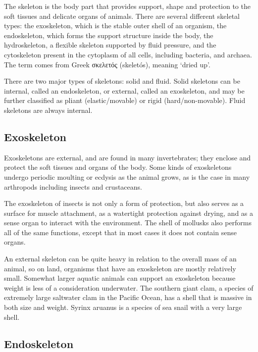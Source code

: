 The skeleton is the body part that provides support, shape and protection to the soft tissues and delicate organs of animals. There are several different skeletal types: the exoskeleton, which is the stable outer shell of an organism, the endoskeleton, which forms the support structure inside the body, the hydroskeleton, a flexible skeleton supported by fluid pressure, and the cytoskeleton present in the cytoplasm of all cells, including bacteria, and archaea. The term comes from Greek σκελετός (skeletós), meaning `dried up'.

There are two major types of skeletons: solid and fluid. Solid skeletons can be internal, called an endoskeleton, or external, called an exoskeleton, and may be further classified as pliant (elastic/movable) or rigid (hard/non-movable). Fluid skeletons are always internal.

\hypertarget{exoskeleton}{%
\subsection{Exoskeleton}\label{exoskeleton}}

Exoskeletons are external, and are found in many invertebrates; they enclose and protect the soft tissues and organs of the body. Some kinds of exoskeletons undergo periodic moulting or ecdysis as the animal grows, as is the case in many arthropods including insects and crustaceans.

The exoskeleton of insects is not only a form of protection, but also serves as a surface for muscle attachment, as a watertight protection against drying, and as a sense organ to interact with the environment. The shell of mollusks also performs all of the same functions, except that in most cases it does not contain sense organs.

An external skeleton can be quite heavy in relation to the overall mass of an animal, so on land, organisms that have an exoskeleton are mostly relatively small. Somewhat larger aquatic animals can support an exoskeleton because weight is less of a consideration underwater. The southern giant clam, a species of extremely large saltwater clam in the Pacific Ocean, has a shell that is massive in both size and weight. Syrinx aruanus is a species of sea snail with a very large shell.

\hypertarget{endoskeleton}{%
\subsection{Endoskeleton}\label{endoskeleton}}

